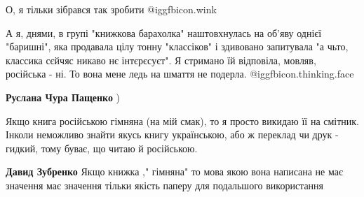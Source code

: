  
О, я тільки зібрався так зробити  @igg{fbicon.wink} 

 

А я, днями, в групі "книжкова барахолка" наштовхнулась на об'яву однієї
"баришні", яка продавала цілу тонну "классіков" і здивовано запитувала "а чьто,
классика сєйчяс никаво нє інтєрєсуєт". Я стримано їй відповіла, мовляв,
російська - ні. То вона мене ледь на шмаття не подерла.  @igg{fbicon.thinking.face} 

 
\textbf{Руслана Чура Пащенко} )

 

Якщо книга російською гімняна (на мій смак), то я просто викидаю її на смітник.
Інколи неможливо знайти якусь книгу українською, або ж переклад чи друк -
гидкий, тому буває, що читаю й російською.


 
\textbf{Давид Зубренко} Якщо книжка ," гімняна" то мова якою вона написана не має значення має значення тільки якість паперу для подальшого використання


 
